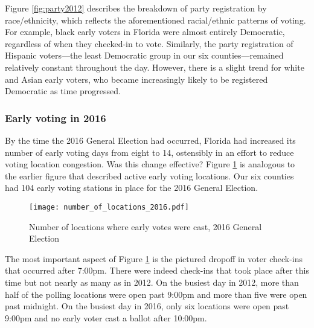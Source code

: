 \documentclass[12pt,titlepage]{article}
\begin{document}
%

Figure \ref{fig:party2012} describes the breakdown of party
registration by race/ethnicity, which reflects the aforementioned
racial/ethnic patterns of voting.  For example, black early voters in
Florida were almost entirely Democratic, regardless of when they
checked-in to vote.  Similarly, the party registration of Hispanic
voters---the least Democratic group in our six counties---remained
relatively constant throughout the day.  However, there is a slight
trend for white and Asian early voters, who became increasingly likely
to be registered Democratic as time progressed.


\subsubsection*{Early voting in 2016}

By the time the 2016 General Election had occurred, Florida had
increased its number of early voting days from eight to 14, ostensibly
in an effort to reduce voting location congestion. Was this change
effective?  Figure \ref{fig:nrlocs2016} is analogous to the earlier
figure that described active early voting locations. Our six counties
had 104 early voting stations in place for the 2016 General Election.


\begin{figure}[!ht]
  \caption{Number of locations where early votes were cast, 2016 General
    Election}
  \label{fig:nrlocs2016}
  \centering
    \centering\texttt{[image: number\_of\_locations\_2016.pdf]}
\end{figure}

The most important aspect of Figure \ref{fig:nrlocs2016} is the
pictured dropoff in voter check-ins that occurred after 7:00pm. There
were indeed check-ins that took place after this time but not nearly
as many as in 2012. On the busiest day in 2012, more than half of the
polling locations were open past 9:00pm and more than five were open
past midnight. On the busiest day in 2016, only six locations were
open past 9:00pm and no early voter cast a ballot after 10:00pm.
\end{document}
